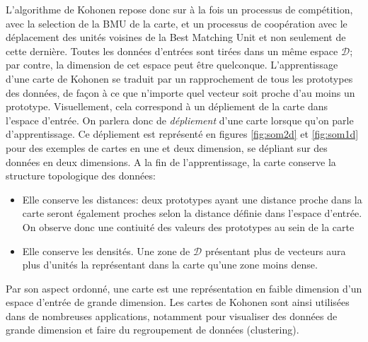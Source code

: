 \documentclass[../main]{subfiles}
\begin{document}
L'algorithme de Kohonen repose donc sur à la fois un processus de compétition, avec la selection de la BMU de la carte, et un processus de coopération avec le déplacement des unités voisines de la Best Matching Unit et non seulement de cette dernière.
Toutes les données d'entrées sont tirées dans un même espace $\mathcal{D}$; par contre, la dimension de cet espace peut être quelconque.
L'apprentissage d'une carte de Kohonen se traduit par un rapprochement de tous les prototypes des données, de façon à ce que n'importe quel vecteur soit proche d'au moins un prototype. Visuellement, cela correspond à un dépliement de la carte dans l'espace d'entrée. On parlera donc de \emph{dépliement} d'une carte lorsque qu'on parle d'apprentissage. Ce dépliement est représenté en figures \ref{fig:som2d} et \ref{fig:som1d} pour des exemples de cartes en une et deux dimension, se dépliant sur des données en deux dimensions. 
A la fin de l'apprentissage, la carte conserve la structure topologique des données:
\begin{itemize}
\item Elle conserve les distances: deux prototypes ayant une distance proche dans la carte seront également proches selon la distance définie dans l'espace d'entrée. On observe donc une contiuité des valeurs des prototypes au sein de la carte
\item Elle conserve les densités. Une zone de $\mathcal{D}$ présentant plus de vecteurs aura plus d'unités la représentant dans la carte qu'une zone moins dense.
\end{itemize}
Par son aspect ordonné, une carte est une représentation en faible dimension d'un espace d'entrée de grande dimension. Les cartes de Kohonen sont ainsi utilisées dans de nombreuses applications, notamment pour visualiser des données de grande dimension et faire du regroupement de données (clustering). 


\end{document}
